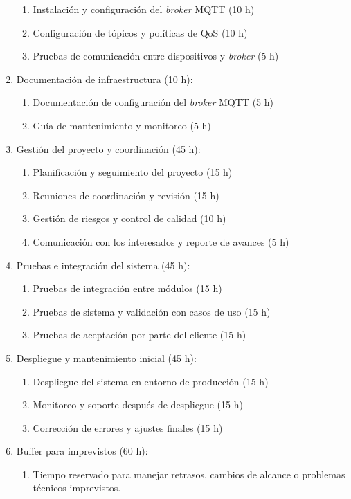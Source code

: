 \documentclass[
11pt, %
]{charter}
\begin{document}
\begin{enumerate}
\begin{enumerate}
\item Instalación y configuración del  \textit{broker} MQTT (10 h)
\item Configuración de tópicos y políticas de QoS (10 h)
\item Pruebas de comunicación entre dispositivos y  \textit{broker} (5 h)
\end{enumerate}
\item Documentación de infraestructura (10 h):
\begin{enumerate}
\item Documentación de configuración del  \textit{broker} MQTT (5 h)
\item Guía de mantenimiento y monitoreo (5 h)
\end{enumerate}
\item Gestión del proyecto y coordinación (45 h):
\begin{enumerate}
\item Planificación y seguimiento del proyecto (15 h)
\item Reuniones de coordinación y revisión (15 h)
\item Gestión de riesgos y control de calidad (10 h)
\item Comunicación con los interesados y reporte de avances (5 h)
\end{enumerate}
\item Pruebas e integración del sistema (45 h):
\begin{enumerate}
\item Pruebas de integración entre módulos (15 h)
\item Pruebas de sistema y validación con casos de uso (15 h)
\item Pruebas de aceptación por parte del cliente (15 h)
\end{enumerate}
\item Despliegue y mantenimiento inicial (45 h):
\begin{enumerate}
\item Despliegue del sistema en entorno de producción (15 h)
\item Monitoreo y soporte después de despliegue (15 h)
\item Corrección de errores y ajustes finales (15 h)
\end{enumerate}
\item Buffer para imprevistos (60 h):
\begin{enumerate}
\item Tiempo reservado para manejar retrasos, cambios de alcance o problemas técnicos imprevistos.
\end{enumerate}
\end{enumerate}
\end{document}
